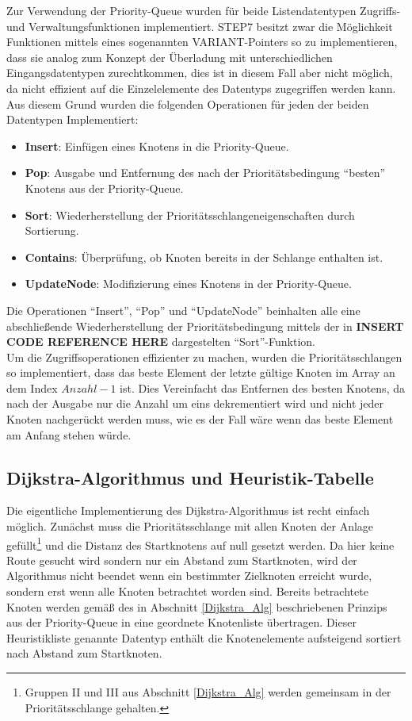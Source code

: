			Zur Verwendung der Priority-Queue wurden für beide Listendatentypen Zugriffs- und Verwaltungsfunktionen implementiert. \ac{STEP7} besitzt zwar die Möglichkeit Funktionen mittels eines sogenannten VARIANT-Pointers so zu implementieren, dass sie analog zum Konzept der Überladung mit unterschiedlichen Eingangsdatentypen zurechtkommen\cite{STEP7Prog}, dies ist in diesem Fall aber nicht möglich, da nicht effizient auf die Einzelelemente des Datentyps zugegriffen werden kann. Aus diesem Grund wurden die folgenden Operationen für jeden der beiden Datentypen Implementiert:
			
			\begin{itemize}
				\item \textbf{Insert}: Einfügen eines Knotens in die Priority-Queue.
				\item \textbf{Pop}: Ausgabe und Entfernung des nach der Prioritätsbedingung "`besten"' Knotens aus der Priority-Queue.
				\item \textbf{Sort}: Wiederherstellung der Prioritätsschlangeneigenschaften durch Sortierung.
				\item \textbf{Contains}: Überprüfung, ob Knoten bereits in der Schlange enthalten ist.
				\item \textbf{UpdateNode}: Modifizierung eines Knotens in der Priority-Queue.
			\end{itemize}
			
			Die Operationen "`Insert"', "`Pop"' und "`UpdateNode"' beinhalten alle eine abschließende Wiederherstellung  der Prioritätsbedingung mittels der in \textbf{INSERT CODE REFERENCE HERE} dargestelten "`Sort"'-Funktion.\\
			Um die Zugriffsoperationen effizienter zu machen, wurden die Prioritätsschlangen so implementiert, dass das beste Element der letzte gültige Knoten im Array an dem Index $Anzahl - 1$ ist. Dies Vereinfacht das Entfernen des besten Knotens, da nach der Ausgabe nur die Anzahl um eins dekrementiert wird und nicht jeder Knoten nachgerückt werden muss, wie es der Fall wäre wenn das beste Element am Anfang stehen würde.
			
		\subsection{Dijkstra-Algorithmus und Heuristik-Tabelle}
			
			Die eigentliche Implementierung des Dijkstra-Algorithmus ist recht einfach möglich. Zunächst muss die Prioritätsschlange mit allen Knoten der Anlage gefüllt\footnote{Gruppen II und III aus Abschnitt \ref{Dijkstra_Alg} werden gemeinsam in der Prioritätsschlange gehalten.} und die Distanz des Startknotens auf null gesetzt werden. 
			Da hier keine Route gesucht wird sondern nur ein Abstand zum Startknoten, wird der Algorithmus nicht beendet wenn ein bestimmter Zielknoten erreicht wurde, sondern erst wenn alle Knoten betrachtet worden sind. Bereits betrachtete Knoten werden gemäß des in Abschnitt \ref{Dijkstra_Alg} beschriebenen Prinzips aus der Priority-Queue in eine geordnete Knotenliste übertragen. Dieser Heuristikliste genannte Datentyp enthält die Knotenelemente aufsteigend sortiert nach Abstand zum Startknoten.\\
			

